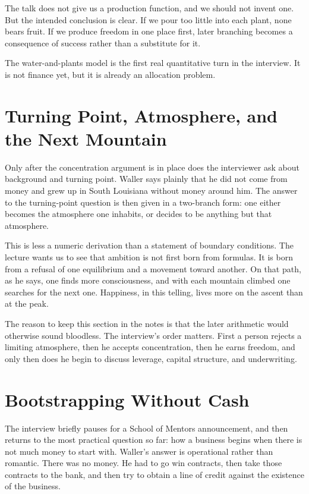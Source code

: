 The talk does not give us a production function, and we should not invent one. But the intended conclusion is clear. If we pour too little into each plant, none bears fruit. If we produce freedom in one place first, later branching becomes a consequence of success rather than a substitute for it.

\begin{remark}
The water-and-plants model is the first real quantitative turn in the interview. It is not finance yet, but it is already an allocation problem.
\end{remark}

\section{Turning Point, Atmosphere, and the Next Mountain}

Only after the concentration argument is in place does the interviewer ask about background and turning point. Waller says plainly that he did not come from money and grew up in South Louisiana without money around him. The answer to the turning-point question is then given in a two-branch form: one either becomes the atmosphere one inhabits, or decides to be anything but that atmosphere.

This is less a numeric derivation than a statement of boundary conditions. The lecture wants us to see that ambition is not first born from formulas. It is born from a refusal of one equilibrium and a movement toward another. On that path, as he says, one finds more consciousness, and with each mountain climbed one searches for the next one. Happiness, in this telling, lives more on the ascent than at the peak.

The reason to keep this section in the notes is that the later arithmetic would otherwise sound bloodless. The interview's order matters. First a person rejects a limiting atmosphere, then he accepts concentration, then he earns freedom, and only then does he begin to discuss leverage, capital structure, and underwriting.

\section{Bootstrapping Without Cash}

The interview briefly pauses for a School of Mentors announcement, and then returns to the most practical question so far: how a business begins when there is not much money to start with. Waller's answer is operational rather than romantic. There was no money. He had to go win contracts, then take those contracts to the bank, and then try to obtain a line of credit against the existence of the business.

